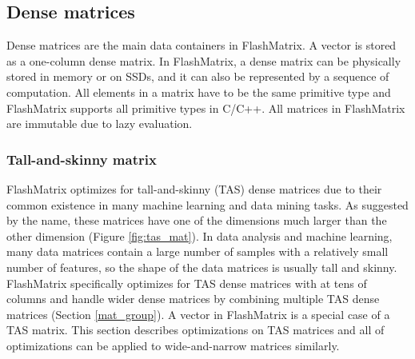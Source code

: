 \subsection{Dense matrices}
Dense matrices are the main data containers in FlashMatrix. A vector is stored
as a one-column dense matrix. In FlashMatrix, a dense matrix can be physically
stored in memory or on SSDs, and it can also be represented by a sequence of
computation. All elements in a matrix have to be the same primitive type and
FlashMatrix supports all primitive types in C/C++. All matrices in FlashMatrix
are immutable due to lazy evaluation.


\subsubsection{Tall-and-skinny matrix} \label{sec:tas_mat}

FlashMatrix optimizes for tall-and-skinny (TAS) dense matrices due to
their common existence in many machine learning and data mining tasks.
As suggested by the name, these matrices have one of the dimensions much larger
than the other dimension (Figure \ref{fig:tas_mat}).
In data analysis and machine learning, many data matrices contain
a large number of samples with a relatively small number of features,
so the shape of the data matrices is usually tall and skinny. FlashMatrix
specifically optimizes for TAS dense matrices with at tens of columns
and handle wider dense matrices by combining multiple TAS dense matrices
(Section \ref{mat_group}). A vector in FlashMatrix is a special case of a TAS
matrix. This section describes optimizations on TAS matrices and all of
optimizations can be applied to wide-and-narrow matrices similarly.

